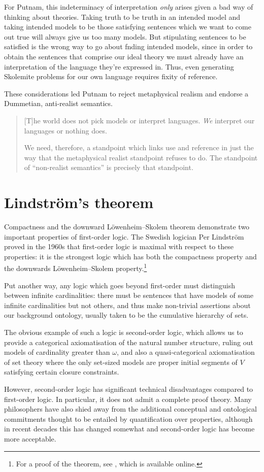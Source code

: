 \documentclass[10pt, a4paper, oneside]{article}
\theoremstyle{definition}
\theoremstyle{remark}
\theoremstyle{plain}
\theoremstyle{plain}
\begin{document}
For Putnam, this indeterminacy of interpretation \emph{only} arises given a bad
way of thinking about theories. Taking truth to be truth in an intended model
and taking intended models to be those satisfying sentences which we want to
come out true will always give us too many models. But stipulating sentences to
be satisfied is the wrong way to go about fnding intended models, since in order
to obtain the sentences that comprise our ideal theory we must already have an
interpretation of the language they're expressed in. Thus, even generating
Skolemite problems for our own language requires fixity of reference.

These considerations led Putnam to reject metaphysical realism and endorse a
Dummetian, anti-realist semantics.

\begin{quote}
    [T]he world does not pick models or interpret languages. \emph{We} interpret
    our languages or nothing does.
    
    We need, therefore, a standpoint which links use and reference in just the
    way that the metaphysical realist standpoint refuses to do. The standpoint
    of ``non-realist semantics'' is precisely that standpoint.
    \citep[p. 482]{putnam1980}
\end{quote}


\section{Lindström's theorem}

Compactness and the downward Löwenheim--Skolem theorem demonstrate two
important properties of first-order logic. The Swedish logician Per Lindström
proved in the 1960s that first-order logic is maximal with respect to these
properties: it is the strongest logic which has both the compactness property
and the downwards Löwenheim--Skolem property.\footnote{For a proof of the
theorem, see \citet{vaananen2010}, which is available online.}

Put another way, any logic which goes beyond first-order must distinguish
between infinite cardinalities: there must be sentences that have models of
some infinite cardinalities but not others, and thus make non-trivial assertions
about our background ontology, usually taken to be the cumulative hierarchy of
sets.

The obvious example of such a logic is second-order logic, which allows us to
provide a categorical axiomatisation of the natural number structure, ruling out
models of cardinality greater than $\omega$, and also a quasi-categorical
axiomatisation of set theory where the only set-sized models are proper initial
segments of $V$ satisfying certain closure constraints.

However, second-order logic has significant technical disadvantages compared to
first-order logic. In particular, it does not admit a complete proof theory.
Many philosophers have also shied away from the additional conceptual and
ontological commitments thought to be entailed by quantification over
properties, although in recent decades this has changed somewhat and
second-order logic has become more acceptable.



\end{document}
